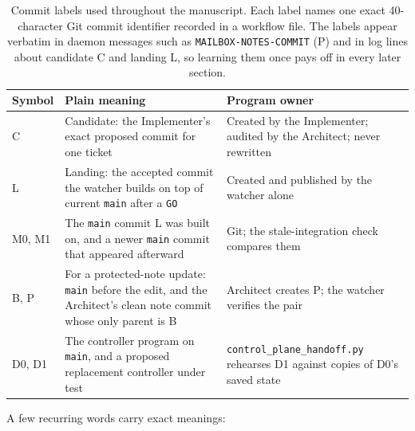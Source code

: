\documentclass[10pt,aps,prd,twocolumn,nofootinbib]{revtex4-2}
\newcommand{\code}[1]{\texttt{#1}}
\newcommand{\file}[1]{\texttt{#1}}
\begin{document}
\begin{table}[t]
\centering
\begin{tabular}{p{}p{}p{}}
\toprule
Symbol & Plain meaning & Program owner \\
\midrule
C & Candidate: the Implementer's exact proposed commit for one ticket &
Created by the Implementer; audited by the Architect; never rewritten \\
L & Landing: the accepted commit the watcher builds on top of current
\code{main} after a \code{GO} & Created and published by the watcher
alone \\
M0, M1 & The \code{main} commit L was built on, and a newer \code{main}
commit that appeared afterward & Git; the stale-integration check
compares them \\
B, P & For a protected-note update: \code{main} before the edit, and
the Architect's clean note commit whose only parent is B & Architect
creates P; the watcher verifies the pair \\
D0, D1 & The controller program on \code{main}, and a proposed
replacement controller under test & \file{control\_plane\_handoff.py}
rehearses D1 against copies of D0's saved state \\
\bottomrule
\end{tabular}
\caption{Commit labels used throughout the manuscript.  Each label
names one exact 40-character Git commit identifier recorded in a
workflow file.  The labels appear verbatim in daemon messages such as
\code{MAILBOX-NOTES-COMMIT} (P) and in log lines about candidate C and
landing L, so learning them once pays off in every later section.}
\label{tab:commit-notation}
\end{table}

A few recurring words carry exact meanings:
\end{document}
